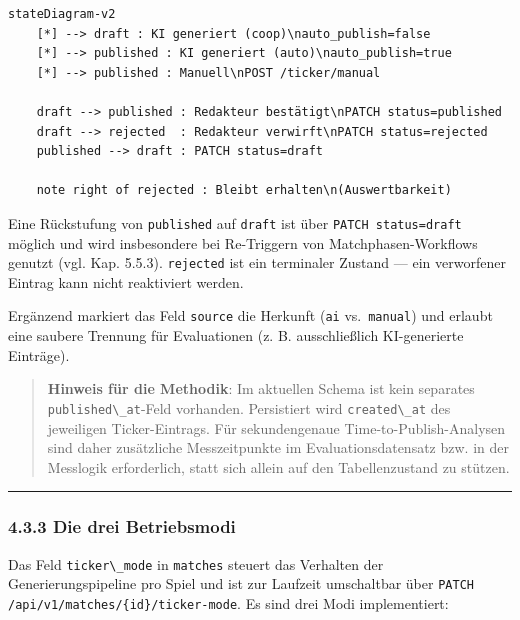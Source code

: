 \begin{lstlisting}
stateDiagram-v2
    [*] --> draft : KI generiert (coop)\nauto_publish=false
    [*] --> published : KI generiert (auto)\nauto_publish=true
    [*] --> published : Manuell\nPOST /ticker/manual

    draft --> published : Redakteur bestätigt\nPATCH status=published
    draft --> rejected  : Redakteur verwirft\nPATCH status=rejected
    published --> draft : PATCH status=draft

    note right of rejected : Bleibt erhalten\n(Auswertbarkeit)
\end{lstlisting}

Eine Rückstufung von \passthrough{\lstinline!published!} auf
\passthrough{\lstinline!draft!} ist über
\passthrough{\lstinline!PATCH status=draft!} möglich und wird
insbesondere bei Re-Triggern von Matchphasen-Workflows genutzt (vgl.
Kap. 5.5.3). \passthrough{\lstinline!rejected!} ist ein terminaler
Zustand --- ein verworfener Eintrag kann nicht reaktiviert werden.

Ergänzend markiert das Feld \passthrough{\lstinline!source!} die
Herkunft (\passthrough{\lstinline!ai!}
vs.~\passthrough{\lstinline!manual!}) und erlaubt eine saubere Trennung
für Evaluationen (z. B. ausschließlich KI-generierte Einträge).

\begin{quote}
\textbf{Hinweis für die Methodik}: Im aktuellen Schema ist kein
separates \passthrough{\lstinline!published\_at!}-Feld vorhanden.
Persistiert wird \passthrough{\lstinline!created\_at!} des jeweiligen
Ticker-Eintrags. Für sekundengenaue Time-to-Publish-Analysen sind daher
zusätzliche Messzeitpunkte im Evaluationsdatensatz bzw. in der Messlogik
erforderlich, statt sich allein auf den Tabellenzustand zu stützen.
\end{quote}

\begin{center}\rule{0.5\linewidth}{0.5pt}\end{center}

\subsubsection{4.3.3 Die drei Betriebsmodi}\label{die-drei-betriebsmodi}

Das Feld \passthrough{\lstinline!ticker\_mode!} in
\passthrough{\lstinline!matches!} steuert das Verhalten der
Generierungspipeline pro Spiel und ist zur Laufzeit umschaltbar über
\passthrough{\lstinline!PATCH /api/v1/matches/\{id\}/ticker-mode!}. Es
sind drei Modi implementiert:

